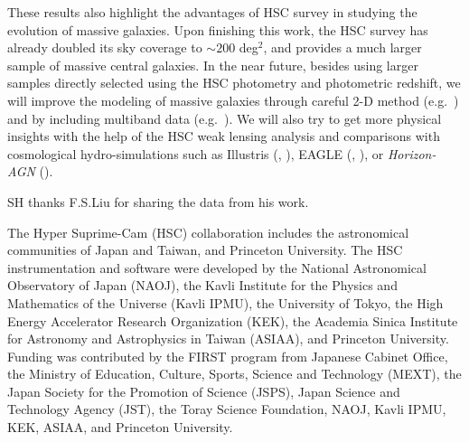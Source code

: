 \documentclass{emulateapj}
\begin{document}
\begin{CJK*}{UTF8}{gbsn}
    These results also highlight the advantages of HSC survey in studying the 
    evolution of massive galaxies.
    Upon finishing this work, the HSC survey has already doubled its sky 
    coverage to $\sim 200$ deg$^2$, and provides a much larger sample of massive 
    central galaxies. 
    In the near future, besides using larger samples directly selected using the 
    HSC photometry and photometric redshift,
    we will improve the modeling of massive galaxies through careful 2-D method 
    (e.g.\ \citealt{Huang2013a}) and by including multiband data 
    (e.g.\ \citealt{Huang2016}).  
    We will also try to get more physical insights with the help of the HSC weak 
    lensing analysis and comparisons with cosmological hydro-simulations such as 
    Illustris (\citealt{Vogelsberger2014}, \citealt{Genel2014}), 
    EAGLE (\citealt{Schaye2015}, \citealt{Crain2015}), 
    or \textit{Horizon-AGN} (\citealt{Dubois2014}).

  
\acknowledgements

  SH thanks F.S.Liu for sharing the data from his work.

  The Hyper Suprime-Cam (HSC) collaboration includes the astronomical communities of 
  Japan and Taiwan, and Princeton University.  The HSC instrumentation and software were
  developed by the National Astronomical Observatory of Japan (NAOJ), the Kavli Institute
  for the Physics and Mathematics of the Universe (Kavli IPMU), the University of Tokyo,
  the High Energy Accelerator Research Organization (KEK), the Academia Sinica Institute
  for Astronomy and Astrophysics in Taiwan (ASIAA), and Princeton University.  
  Funding was contributed by the FIRST program from Japanese Cabinet Office, the Ministry 
  of Education, Culture, Sports, Science and Technology (MEXT), the Japan Society for 
  the Promotion of Science (JSPS), Japan Science and Technology Agency (JST), the
  Toray Science Foundation, NAOJ, Kavli IPMU, KEK, ASIAA, and Princeton University.
   

\end{CJK*}
\end{document}
